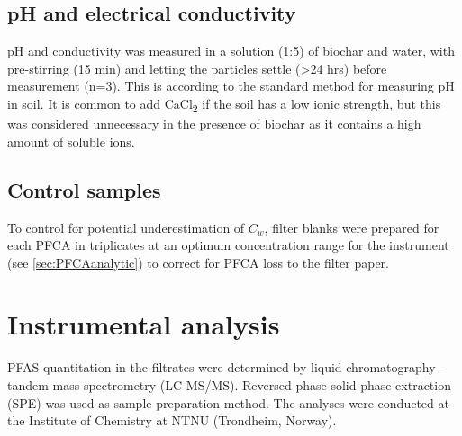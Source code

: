 \subsection{pH and electrical conductivity}
pH and conductivity was measured in a solution (1:5) of biochar and water, with pre-stirring (15 min) and letting the particles settle (\textgreater 24 hrs) before measurement (n=3). This is according to the standard method for measuring pH in soil. It is common to add CaCl\textsubscript{2} if the soil has a low ionic strength, but this was considered unnecessary in the presence of biochar as it contains a high amount of soluble ions. 

\subsection{Control samples}
To control for potential underestimation of $C_w$, filter blanks were prepared for each PFCA in triplicates at an optimum concentration range for the instrument (see \cref{sec:PFCAanalytic}) to correct for PFCA loss to the filter paper. 


\section{Instrumental analysis} \label{methods:instrAnalysis}
PFAS quantitation in the filtrates were determined by liquid chromatography--tandem mass spectrometry (LC-MS/MS). Reversed phase solid phase extraction (SPE) was used as sample preparation method. The analyses were conducted at the Institute of Chemistry at NTNU (Trondheim, Norway).

